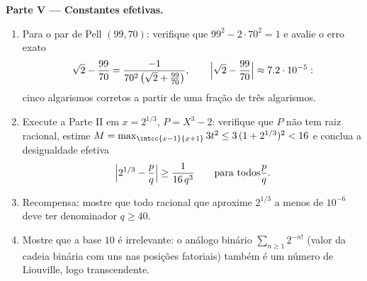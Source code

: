 \begin{problem}
\medskip
\noindent\textbf{Parte V --- Constantes efetivas.}
\begin{enumerate}
  \item Para o par de Pell $(99, 70)$: verifique que $99^2 - 2\cdot70^2
        = 1$ e avalie o erro exato
        \[
        \sqrt2 - \frac{99}{70}
        = \frac{-1}{70^2\,\bigl(\sqrt2 + \frac{99}{70}\bigr)},
        \qquad
        \Bigl|\sqrt 2 - \frac{99}{70}\Bigr| \approx 7.2\cdot
        10^{-5} :
        \]
        cinco algarismos corretos a partir de uma fração de três
        algarismos.
  \item Execute a Parte II em $x = 2^{1/3}$, $P = X^3 - 2$: verifique que $P$
        não tem raiz racional, estime $M = \max_{\intcc{x-1}{x+1}}
        3t^2 \leq 3\,(1 + 2^{1/3})^2 < 16$ e conclua a
        desigualdade efetiva
        \[
        \Bigl| 2^{1/3} - \frac pq \Bigr| \geq
        \frac{1}{16\,q^3} \qquad \text{para todos} \frac pq .
        \]
  \item Recompensa: mostre que todo racional que aproxime $2^{1/3}$
        a menos de $10^{-6}$ deve ter denominador $q \geq 40$.
  \item Mostre que a base $10$ é irrelevante: o análogo binário
        $\sum_{n\geq1} 2^{-n!}$ (valor da cadeia binária
        com uns nas posições fatoriais) também é um
        número de Liouville, logo transcendente.
\end{enumerate}


\end{problem}
